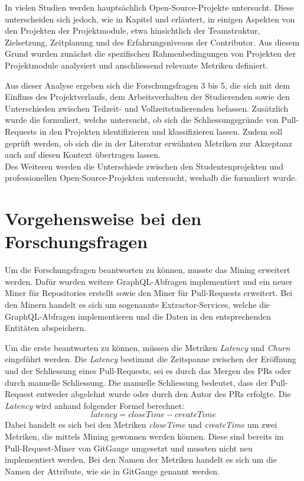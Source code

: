 In vielen Studien werden hauptsächlich Open-Source-Projekte untersucht. Diese unterscheiden sich jedoch, wie in Kapitel  und  erläutert, in einigen Aspekten von den Projekten der Projektmodule, etwa hinsichtlich der Teamstruktur, Zielsetzung, Zeitplanung und des Erfahrungsniveaus der Contributor.
Aus diesem Grund wurden zunächst die spezifischen Rahmenbedingungen von Projekten der Projektmodule analysiert und anschliessend relevante Metriken definiert.

Aus dieser Analyse ergeben sich die Forschungsfragen 3 bis 5, die sich mit dem Einfluss des Projektverlaufs, dem Arbeitsverhalten der Studierenden sowie den Unterschieden zwischen Teilzeit- und Vollzeitstudierenden befassen. Zusätzlich wurde die  formuliert, welche untersucht, ob sich die Schliessungsgründe von Pull-Requests in den Projekten identifizieren und klassifizieren lassen. Zudem soll geprüft werden, ob sich die in der Literatur erwähnten Metriken zur Akzeptanz auch auf diesen Kontext übertragen lassen. \\Des Weiteren werden die Unterschiede zwischen den Studentenprojekten und professionellen Open-Source-Projekten untersucht, weshalb die  formuliert wurde. 

\section{Vorgehensweise bei den For\-schungs\-fragen}
\label{sec:AnalyseChurnvsLatency}
\label{sec:Metriken}
Um die Forschungsfragen beantworten zu können, musste das Mining erweitert werden. Dafür wurden weitere GraphQL-Abfragen implementiert und ein neuer Miner für Repositories erstellt sowie den Miner für Pull-Requests erweitert. Bei den Minern handelt es sich um sogenannte Extractor-Services, welche die GraphQL-Abfragen implementieren und die Daten in den entsprechenden Entitäten abspeichern.

Um die erste  beantworten zu können, müssen die Metriken \textit{Latency} und \textit{Churn} eingeführt werden. Die \textit{Latency} bestimmt die Zeitspanne zwischen der Eröffnung und der Schliessung eines Pull-Requests, sei es durch das Mergen des PRs oder durch manuelle Schliessung. Die manuelle Schliessung bedeutet, dass der Pull-Request entweder abgelehnt wurde oder durch den Autor des PRs erfolgte. Die \textit{Latency} wird anhand folgender Formel berechnet:
\begin{equation}
latency = closeTime - createTime
\end{equation}
Dabei handelt es sich bei den Metriken \textit{closeTime} und \textit{createTime} um zwei Metriken, die mittels Mining gewonnen werden können. Diese sind bereits im Pull-Request-Miner von GitGauge umgesetzt und mussten nicht neu implementiert werden. Bei den Namen der Metriken handelt es sich um die Namen der Attribute, wie sie in GitGauge genannt werden.

